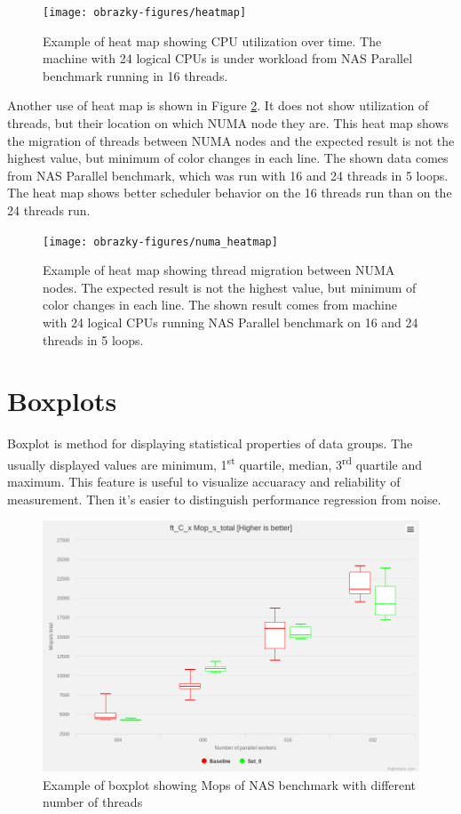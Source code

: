 \begin{figure}
  \centering
  \texttt{[image: obrazky-figures/heatmap]}
  \caption{Example of heat map showing CPU utilization over time. The machine
    with 24 logical CPUs is under workload from NAS Parallel benchmark running
    in 16 threads.}
  \label{fig:heatmap}
\end{figure}

Another use of heat map is shown in Figure \ref{fig:numa_heatmap}. It does not
show utilization of threads, but their location on which NUMA node they are.
This heat map shows the migration of threads between NUMA nodes and the expected
result is not the highest value, but minimum of color changes in each line. The
shown data comes from NAS Parallel benchmark, which was run with 16 and 24
threads in 5 loops. The heat map shows better scheduler behavior on the 16
threads run than on the 24 threads run.

\begin{figure}
  \centering
  \texttt{[image: obrazky-figures/numa\_heatmap]}
  \caption{Example of heat map showing thread migration between NUMA nodes. The
    expected result is not the highest value, but minimum of color changes in
    each line. The shown result comes from machine with 24 logical CPUs running
    NAS Parallel benchmark on 16 and 24 threads in 5 loops.}
  \label{fig:numa_heatmap}
\end{figure}

\section{Boxplots}
Boxplot is method for displaying statistical properties of data groups. The
usually displayed values are minimum, 1\textsuperscript{st} quartile, median,
3\textsuperscript{rd} quartile and maximum.
This feature is useful to visualize accuaracy and reliability of measurement.
Then it's easier to distinguish performance regression from noise.

\begin{figure}
  \centering
  \includegraphics[width=12cm]{obrazky-figures/boxplot}
  \caption{Example of boxplot showing Mops of NAS benchmark with different
    number of threads}
\end{figure}


